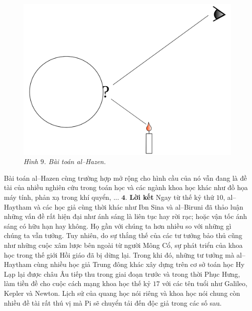 \begin{multicols}{2}
	\begin{figure}[H]
		\vspace*{-10pt}
		\centering
		\captionsetup{labelformat= empty, justification=centering}
		\includegraphics[width= 1\linewidth]{10}
		\caption{\small\textit{\color{lichsutoanhoc}Hình $9$. Bài toán al--Hazen.}}
		\vspace*{-10pt}
	\end{figure}
	Bài toán al--Hazen cùng trường hợp mở rộng cho hình cầu của nó vẫn đang là đề tài của nhiều nghiên cứu trong toán học và các ngành khoa học khác như đồ họa máy tính, phản xạ trong khí quyển, ...
	\vskip 0.1cm
	$\pmb{4.}$ \textbf{\color{lichsutoanhoc}Lời kết}
	\vskip 0.1cm
	Ngay từ thế kỷ thứ $10$, al--Haytham và các học giả cùng thời khác như Ibn Sina và al--Biruni đã thảo luận những vấn đề rất hiện đại như ánh sáng là liên tục hay rời rạc; hoặc vận tốc ánh sáng có hữu hạn hay không. Họ gần với chúng ta hơn nhiều so với những gì chúng ta vẫn tưởng. Tuy nhiên, do sự thắng thế của các tư tưởng bảo thủ cũng như những cuộc xâm lược bên ngoài từ người Mông Cổ, sự phát triển của khoa học trong thế giới Hồi giáo đã bị dừng lại. Trong khi đó, những tư tưởng mà al--Haytham cùng nhiều học giả Trung đông khác xây dựng trên cơ sở toán học Hy Lạp lại được châu Âu tiếp thu trong giai đoạn trước và trong thời Phục Hưng, làm tiền đề cho cuộc cách mạng khoa học thế kỷ $17$ với các tên tuổi như Galileo, Kepler và Newton. Lịch sử của quang học nói riêng và khoa học nói chung còn nhiều đề tài rất thú vị mà Pi sẽ chuyển tải đến độc giả trong các số sau.
	\begin{figure}[H]
		\vspace*{-5pt}
		\centering

\end{figure}
\end{multicols}
